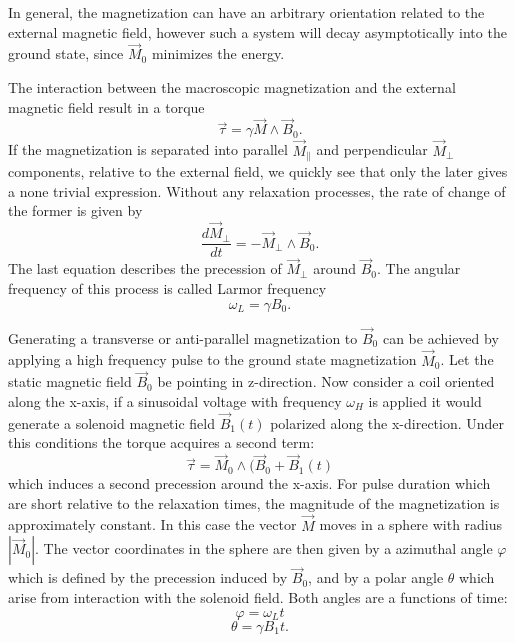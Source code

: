 In general, the magnetization can have an arbitrary orientation related to the external magnetic field, however such a system will decay asymptotically into the ground state, since $\vec{M}_0$ minimizes the energy. 

The interaction between the macroscopic magnetization and the external magnetic field result in a torque
\begin{equation}
\vec{\tau} = \gamma\vec{M} \wedge\vec{B}_0.
\end{equation}
If the magnetization is separated into parallel $\vec{M}_{\parallel}$ and perpendicular $\vec{M}_{\perp}$ components, relative to the external field, we quickly see that only the later gives a none trivial expression. Without any relaxation processes, the rate of change of the former is given by
\begin{equation}
\frac{d \vec{M}_{\perp}}{dt} = -\vec{M}_{\perp}\wedge\vec{B}_0.
\end{equation}
The last equation describes the precession of $\vec{M}_{\perp}$ around $\vec{B}_0$. The angular frequency of this process is called Larmor frequency
\begin{equation}
\label{eq: larmor freq}
\omega_L = \gamma B_0.
\end{equation}

Generating a transverse or anti-parallel magnetization to $\vec{B}_0$ can be achieved by applying a high frequency pulse to the ground state magnetization $\vec{M}_0$. 
Let the static magnetic field $\vec{B}_0$ be pointing in z-direction. Now consider a coil oriented along the x-axis, if a sinusoidal voltage with frequency $\omega_H$ is applied it would generate a solenoid magnetic field $\vec{B}_1(t)$ polarized along the x-direction. Under this conditions the torque  acquires a second term:
\begin{equation}
\vec{\tau} = \vec{M}_0\wedge(\vec{B}_0 + \vec{B}_1(t)
\end{equation}
which induces a second precession around the x-axis.
For pulse duration which are short relative to the relaxation times, the magnitude of the magnetization is approximately constant. In this case the vector $\vec{M}$ moves in a sphere with radius $|\vec{M}_0|$. The vector coordinates in the sphere are then given by a azimuthal angle $\varphi$ which is defined by the precession induced by $\vec{B}_0$, and by a polar angle $\theta$ which arise from interaction with the solenoid field. Both angles are a functions of time:
\begin{equation}
\varphi = \omega_L t
\end{equation}
\begin{equation}
\theta = \gamma B_1 t.
\end{equation}

